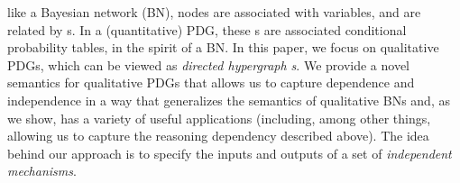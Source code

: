 {like a Bayesian network (BN), nodes are associated with variables, and
are related by \hyperarc s.  
In a (quantitative) PDG, these \hyperarc s
are associated conditional probability tables, in the spirit of a BN.
In this paper, we focus on qualitative PDGs, which can be viewed as
\emph{directed hypergraph s}.
We provide a novel semantics for qualitative PDGs that allows us to
capture dependence and independence in a way that generalizes the
semantics of qualitative BNs and, as we show, has a variety of useful
applications (including, among other things, allowing us to capture
the reasoning dependency described above).
}%
The idea behind our approach
is to specify 
the inputs and outputs of a set of \emph{independent mechanisms}.
